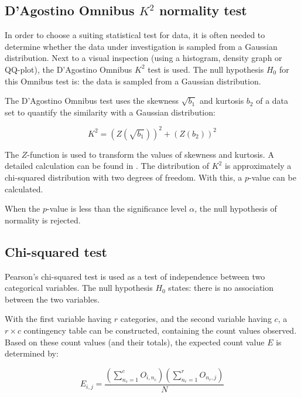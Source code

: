 \subsection{D'Agostino Omnibus $K^2$ normality test} %
\label{sub:d_agostino_normality_test}
In order to choose a suiting statistical test for data, it is often needed to determine whether the data under investigation is sampled from a Gaussian distribution. Next to a visual inspection (using a histogram, density graph or QQ-plot), the D'Agostino Omnibus $K^2$ test \cite{D'Agostino1971,D'agostinoR.B.andBelangerA.andD'AgostinoJr1990} is used. The null hypothesis $H_0$ for this Omnibus test is: the data is sampled from a Gaussian distribution.

The D'Agostino Omnibus test uses the skewness $\sqrt{b_1}$ and kurtosis $b_2$  of a data set to quantify the similarity with a Gaussian distribution:

\begin{equation}
	K^2 = (Z(\sqrt{b_1}))^2 + (Z(b_2))^2
\end{equation}

The $Z$-function is used to transform the values of skewness and kurtosis. A detailed calculation can be found in \cite{D'Agostino1971}. The distribution of $K^2$ is approximately a chi-squared distribution with two degrees of freedom. With this, a $p$-value can be calculated. 

When the $p$-value is less than the significance level $\alpha$, the null hypothesis of normality is rejected.


\subsection{Chi-squared test} %
\label{sub:chi_squared_test}
Pearson's chi-squared test \cite{Pearson1900} is used as a test of independence between two categorical variables. The null hypothesis $H_0$ states: there is no association between the two variables.

With the first variable having $r$ categories, and the second variable having $c$, a $r \times c$ contingency table can be constructed, containing the count values observed. Based on these count values (and their totals), the expected count value $E$ is determined by:

\begin{equation}
	E_{i,j}=\frac{(\sum_{n_c=1}^c O_{i,n_c}) (\sum_{n_r=1}^r O_{n_r,j})}{N} 
\end{equation}

